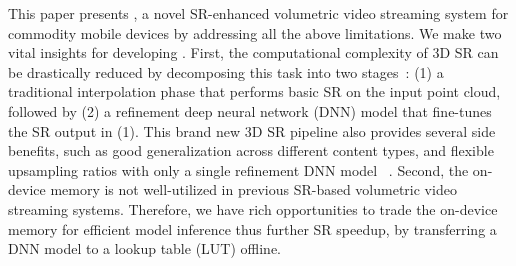 

This paper presents \name, a novel SR-enhanced volumetric video streaming system for commodity mobile devices by addressing all the above limitations. 
%
We make two vital insights for developing \name. First, the computational complexity of 3D SR can be drastically reduced by decomposing this task into two stages~\cite{liu_grad_2020}: (1) a traditional interpolation phase that performs basic SR on the input point cloud, followed by (2) a refinement deep neural network (DNN) model that fine-tunes the SR output in (1). 
%
This brand new 3D SR pipeline also provides several side benefits, such as good generalization across different content types, and flexible upsampling ratios with only a single refinement DNN model~\cite{liu_grad_2020} .
%
Second, the on-device memory is not well-utilized in previous SR-based volumetric video streaming systems. Therefore, we have rich opportunities to trade the on-device memory for efficient model inference thus further SR speedup, by transferring a DNN model to a lookup table (LUT) offline.


